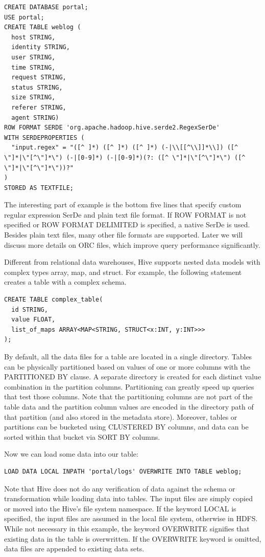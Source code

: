 \documentclass[11pt]{book}
\begin{document}
\begin{lstlisting}
CREATE DATABASE portal;
USE portal;
CREATE TABLE weblog (
  host STRING,
  identity STRING,
  user STRING,
  time STRING,
  request STRING,
  status STRING,
  size STRING,
  referer STRING,
  agent STRING)
ROW FORMAT SERDE 'org.apache.hadoop.hive.serde2.RegexSerDe'
WITH SERDEPROPERTIES (
  "input.regex" = "([^ ]*) ([^ ]*) ([^ ]*) (-|\\[[^\\]]*\\]) ([^ \"]*|\"[^\"]*\") (-|[0-9]*) (-|[0-9]*)(?: ([^ \"]*|\"[^\"]*\") ([^ \"]*|\"[^\"]*\"))?"
)
STORED AS TEXTFILE;
\end{lstlisting}
The interesting part of example is the bottom five lines that specify custom regular expression SerDe and plain text file format. If ROW FORMAT is not specified or ROW FORMAT DELIMITED is specified, a native SerDe is used. Besides plain text files, many other file formats are supported. Later we will discuss more details on ORC files, which improve query performance significantly.

Different from relational data warehouses, Hive supports nested data models with complex types array, map, and struct. For example, the following statement creates a table with a complex schema.

\begin{lstlisting}
CREATE TABLE complex_table(
  id STRING,
  value FLOAT,
  list_of_maps ARRAY<MAP<STRING, STRUCT<x:INT, y:INT>>>
);
\end{lstlisting}
By default, all the data files for a table are located in a single directory. Tables can be physically partitioned based on values of one or more columns with the PARTITIONED BY clause. A separate directory is created for each distinct value combination in the partition columns. Partitioning can greatly speed up queries that test those columns. Note that the partitioning columns are not part of the table data and the partition column values are encoded in the directory path of that partition (and also stored in the metadata store). Moreover, tables or partitions can be bucketed using CLUSTERED BY columns, and data can be sorted within that bucket via SORT BY columns.

Now we can load some data into our table:

\begin{lstlisting}
LOAD DATA LOCAL INPATH 'portal/logs' OVERWRITE INTO TABLE weblog;
\end{lstlisting}
Note that Hive does not do any verification of data against the schema or transformation while loading data into tables. The input files are simply copied or moved into the Hive's file system namespace. If the keyword LOCAL is specified, the input files are assumed in the local file system, otherwise in HDFS. While not necessary in this example, the keyword OVERWRITE signifies that existing data in the table is overwritten. If the OVERWRITE keyword is omitted, data files are appended to existing data sets.
\end{document}
